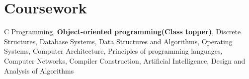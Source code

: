 \documentclass[letterpaper,10pt]{article}
\newcommand{\resumeOrganizationHeading}[3]{
  \vspace{-2pt}\item
    \begin{tabular*}{0.97\textwidth}[t]{lr}
      \textbf{#1} & \textit{\small #2} \\
      \textit{\small#3}
    \end{tabular*}\vspace{-7pt}
}
\newcommand{\resumeSubHeadingListStart}{\begin{itemize}[leftmargin=0.15in, label={}]}
\newcommand{\resumeSubHeadingListEnd}{\end{itemize}}
\begin{document}
	


 \section{Coursework}
 	\vspace{2pt}
 	\resumeSubHeadingListStart
 		\small{\item{
 				C Programming, \textbf{Object-oriented programming(Class topper)}, Discrete Structures, Database Systems, Data Structures and Algorithms, Operating Systems, Computer Architecture, Principles of programming languages, Computer Networks, Compiler Construction, Artificial Intelligence, Design and Analysis of Algorithms 
 				 \\ \vspace{3pt}
 		}
 				}
 	\resumeSubHeadingListEnd



	













\end{document}
